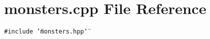 \section{monsters.cpp File Reference}
\label{monsters_8cpp}
{\tt \#include \char`\"{}monsters.hpp\char`\"{}}\par
